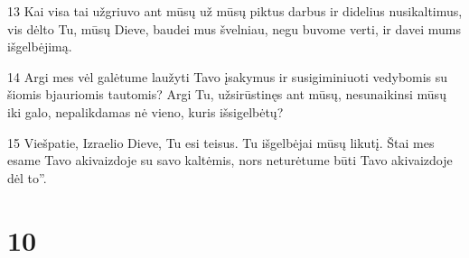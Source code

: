 \par 13 Kai visa tai užgriuvo ant mūsų už mūsų piktus darbus ir didelius nusikaltimus, vis dėlto Tu, mūsų Dieve, baudei mus švelniau, negu buvome verti, ir davei mums išgelbėjimą. 
\par 14 Argi mes vėl galėtume laužyti Tavo įsakymus ir susigiminiuoti vedybomis su šiomis bjauriomis tautomis? Argi Tu, užsirūstinęs ant mūsų, nesunaikinsi mūsų iki galo, nepalikdamas nė vieno, kuris išsigelbėtų? 
\par 15 Viešpatie, Izraelio Dieve, Tu esi teisus. Tu išgelbėjai mūsų likutį. Štai mes esame Tavo akivaizdoje su savo kaltėmis, nors neturėtume būti Tavo akivaizdoje dėl to”.



\chapter{10}

